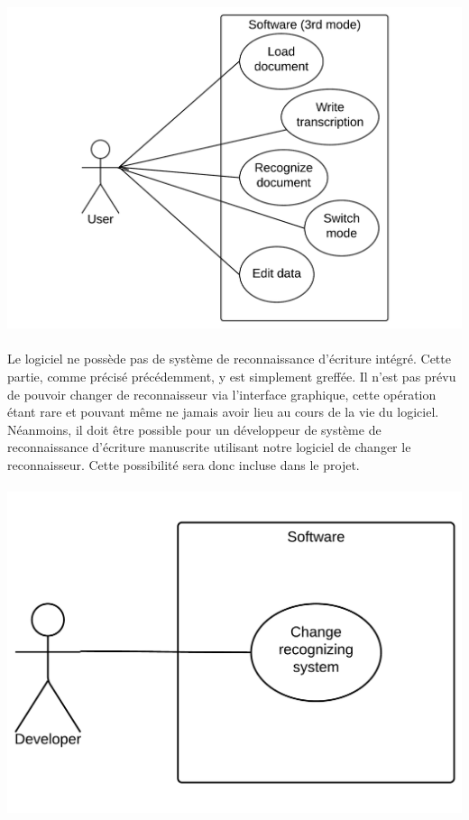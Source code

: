 \paragraph{}
\begin{mdframed}[frametitle={Figure 4 : Diagramme de cas d'utilisation (mode production)}, innerbottommargin=10]
\begin{center}
\includegraphics[scale=0.6]{Usecase_3.pdf}
\end{center}
\end{mdframed}

\paragraph{}
Le logiciel ne possède pas de système de reconnaissance d’écriture intégré.
Cette partie, comme précisé précédemment, y est simplement greffée. Il n’est
pas prévu de pouvoir changer de reconnaisseur via l’interface graphique, cette
opération étant rare et pouvant même ne jamais avoir lieu au cours de la vie du
logiciel. Néanmoins, il doit être possible pour un développeur de système de
reconnaissance d’écriture manuscrite utilisant notre logiciel de changer le
reconnaisseur. Cette possibilité sera donc incluse dans le projet.

\paragraph{}
\begin{mdframed}[frametitle={Figure 5 : Diagramme de cas d'utilisation (pour développeur)}, innerbottommargin=10]
\begin{center}
\includegraphics[scale=0.7]{Usecase_Dev.pdf}
\end{center}
\end{mdframed}
